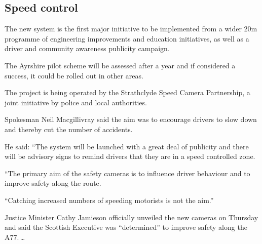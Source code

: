 \documentclass[11pt]{article}
\begin{document}
\subsection*{Speed control}

The new system is the first major initiative to be implemented from a
wider \textsterling 20m programme of engineering improvements and
education initiatives, as well as a driver and community awareness
publicity campaign.

The Ayrshire pilot scheme will be assessed after a year and if
considered a success, it could be rolled out in other areas.

The project is being operated by the Strathclyde Speed Camera
Partnership, a joint initiative by police and local authorities.

Spokesman Neil Macgillivray said the aim was to encourage drivers to
slow down and thereby cut the number of accidents.

He said: ``The system will be launched with a great deal of publicity
and there will be advisory signs to remind drivers that they are in a
speed controlled zone.

``The primary aim of the safety cameras is to influence driver
behaviour and to improve safety along the route.

``Catching increased numbers of speeding motorists is not the aim.''

Justice Minister Cathy Jamieson officially unveiled the new cameras on
Thursday and said the Scottish Executive was ``determined'' to improve
safety along the A77.\,\dots
\end{document}
